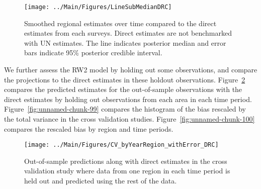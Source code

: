 \documentclass[12pt]{article}\usepackage[]{graphicx}\usepackage[]{color}
\newenvironment{knitrout}{}{} %
\begin{document}
\begin{knitrout}
\color{fgcolor}\begin{figure}[bht]

{\centering \texttt{[image: ../Main/Figures/LineSubMedianDRC]} 

}

\caption[Smoothed regional estimates over time compared to the direct estimates from each surveys]{Smoothed regional estimates over time compared to the direct estimates from each surveys. Direct estimates are not benchmarked with UN estimates. The line indicates posterior median and error bars indicate 95\% posterior credible interval.}\label{fig:unnamed-chunk-97}
\end{figure}


\end{knitrout}
We further assess the RW2 model by holding out some observations, and compare the projections to the direct estimates in these holdout observations. Figure~\ref{fig:unnamed-chunk-98} compares the predicted estimates for the out-of-sample observations  with the direct estimates by holding out observations from each area in each time period.  Figure~\ref{fig:unnamed-chunk-99} compares the histogram of the bias rescaled by the total variance in the cross validation studies. Figure~\ref{fig:unnamed-chunk-100} compares the rescaled bias by region and time periods.



 
\begin{knitrout}
\color{fgcolor}\begin{figure}[bht]

{\centering \texttt{[image: ../Main/Figures/CV\_byYearRegion\_withError\_DRC]} 

}

\caption[Out-of-sample predictions along with direct estimates in the cross validation study where data from one region in each time period is held out and predicted using the rest of the data]{Out-of-sample predictions along with direct estimates in the cross validation study where data from one region in each time period is held out and predicted using the rest of the data.}\label{fig:unnamed-chunk-98}
\end{figure}


\end{knitrout}
\end{document}
